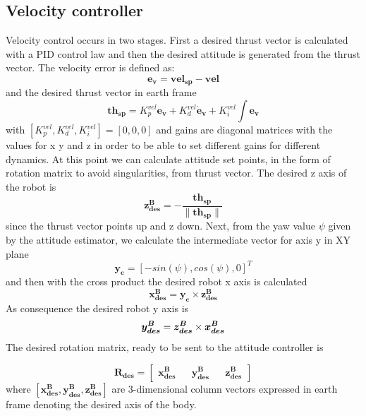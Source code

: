 \subsection{Velocity controller}
Velocity control occurs in two stages. First a desired thrust vector is calculated with a PID control law and then the desired attitude is generated from the thrust vector. The velocity error is defined as:
\begin{equation}
 \boldsymbol{e_v} =  \boldsymbol{vel_{sp}} - \boldsymbol{vel}
\end{equation}
and the desired thrust vector in earth frame
\begin{equation}
 \boldsymbol{th_{sp}} = K_p^{vel}  \boldsymbol{e_v} + K_d^{vel}  \boldsymbol{\dot{e}_v} + K_i^{vel} \int  \boldsymbol{e_v}
\end{equation}
with $ [K_p^{vel} ,  K_d^{vel} ,  K_i^{vel}] = [0,0,0]$  and gains are diagonal matrices with the values for x y and z in order to be able to set different gains for different dynamics. At this point we can calculate attitude set points, in the form of rotation matrix to avoid singularities, from thrust vector. The desired z axis of the robot is
\begin{equation}
	\boldsymbol{z^B_{des}} = - \frac{\boldsymbol{th_{sp}}}{\lVert\boldsymbol{th_{sp}}\rVert} 
\end{equation}
since the thrust vector points up and z down. Next, from the yaw value $\psi$ given by the attitude estimator, we calculate the intermediate vector for axis y in XY plane
\begin{equation}
	\boldsymbol{y_c} = [-sin(\psi) , cos(\psi),0]^T
\end{equation}
and then with the cross product the desired robot x axis is calculated
\begin{equation}
	\boldsymbol{x^B_{des}} = \boldsymbol{y_c} \times \boldsymbol{z^B_{des}}
\end{equation}
As consequence the desired robot y axis is
\begin{equation}
\vspace{2ex}
\boldsymbol{y^B_{des}} = \boldsymbol{z^B_{des}} \times \boldsymbol{x^B_{des}}
\end{equation}
\noindent
The desired rotation matrix, ready to be sent to the attitude controller is

\begin{equation}
\boldsymbol{R_{des}} = \begin{bmatrix}
\boldsymbol{x^B_{des}} && \boldsymbol{y^B_{des}} && \boldsymbol{z^B_{des}}
\end{bmatrix}
\end{equation}
where $[\boldsymbol{x^B_{des}} , \boldsymbol{y^B_{des}} , \boldsymbol{z^B_{des}}]$ are 3-dimensional column vectors expressed in earth frame denoting the desired axis of the body.

